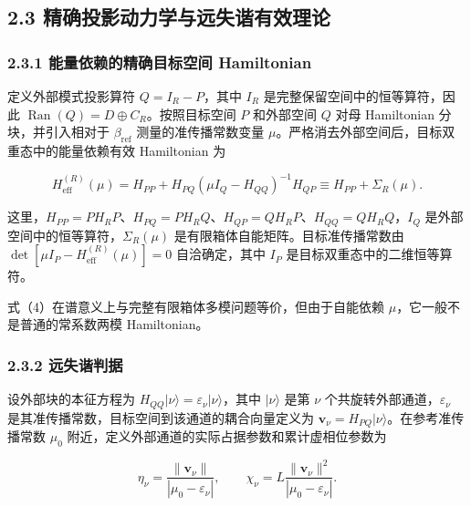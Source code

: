 \documentclass[
  UTF8,
  zihao=-4,
  fontset=fandol]{ctexart}
\begin{document}
\hypertarget{ux7cbeux786eux6295ux5f71ux52a8ux529bux5b66ux4e0eux8fdcux5931ux8c10ux6709ux6548ux7406ux8bba}{%
\subsection{2.3
精确投影动力学与远失谐有效理论}\label{ux7cbeux786eux6295ux5f71ux52a8ux529bux5b66ux4e0eux8fdcux5931ux8c10ux6709ux6548ux7406ux8bba}}

\hypertarget{ux80fdux91cfux4f9dux8d56ux7684ux7cbeux786eux76eeux6807ux7a7aux95f4-hamiltonian}{%
\subsubsection{2.3.1 能量依赖的精确目标空间
Hamiltonian}\label{ux80fdux91cfux4f9dux8d56ux7684ux7cbeux786eux76eeux6807ux7a7aux95f4-hamiltonian}}

定义外部模式投影算符 \(Q=I_R-P\)，其中 \(I_R\)
是完整保留空间中的恒等算符，因此
\(\operatorname{Ran}(Q)=D\oplus C_R\)。按照目标空间 \(P\) 和外部空间
\(Q\) 对母 Hamiltonian 分块，并引入相对于 \(\beta_{\mathrm{ref}}\)
测量的准传播常数变量
\(\mu\)。严格消去外部空间后，目标双重态中的能量依赖有效 Hamiltonian 为

\[
H_{\mathrm{eff}}^{(R)}(\mu)
=H_{PP}+H_{PQ}\left(\mu I_Q-H_{QQ}\right)^{-1}H_{QP}
\equiv H_{PP}+\Sigma_R(\mu).
\tag{4}
\]

这里，\(H_{PP}=PH_RP\)、\(H_{PQ}=PH_RQ\)、\(H_{QP}=QH_RP\)、\(H_{QQ}=QH_RQ\)，\(I_Q\)
是外部空间中的恒等算符，\(\Sigma_R(\mu)\)
是有限箱体自能矩阵。目标准传播常数由
\(\det[\mu I_P-H_{\mathrm{eff}}^{(R)}(\mu)]=0\) 自洽确定，其中 \(I_P\)
是目标双重态中的二维恒等算符。

式（4）在谱意义上与完整有限箱体多模问题等价，但由于自能依赖
\(\mu\)，它一般不是普通的常系数两模 Hamiltonian。

\hypertarget{ux8fdcux5931ux8c10ux5224ux636e}{%
\subsubsection{2.3.2 远失谐判据}\label{ux8fdcux5931ux8c10ux5224ux636e}}

设外部块的本征方程为
\(H_{QQ}|\nu\rangle=\varepsilon_\nu|\nu\rangle\)，其中 \(|\nu\rangle\)
是第 \(\nu\) 个共旋转外部通道，\(\varepsilon_\nu\)
是其准传播常数，目标空间到该通道的耦合向量定义为
\(\mathbf v_\nu=H_{PQ}|\nu\rangle\)。在参考准传播常数 \(\mu_0\)
附近，定义外部通道的实际占据参数和累计虚相位参数为

\[
\eta_\nu=\frac{\|\mathbf v_\nu\|}{|\mu_0-\varepsilon_\nu|},\qquad
\chi_\nu=L\frac{\|\mathbf v_\nu\|^2}{|\mu_0-\varepsilon_\nu|}.
\tag{5}
\]
\end{document}
